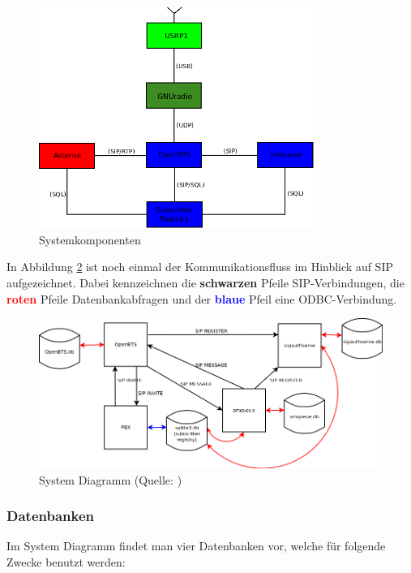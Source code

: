\begin{figure}[htbp]
	\centering
		\includegraphics[width=0.80\textwidth]{img/openbts_comp.png}
	\caption{Systemkomponenten}
	\label{fig:openbts_comp}
\end{figure}


In Abbildung \ref{fig:openbts_system_diagram} ist noch einmal der Kommunikationsfluss im Hinblick auf SIP aufgezeichnet. Dabei kennzeichnen die \textbf{schwarzen} Pfeile SIP-Verbindungen, die \textcolor{red}{\textbf{roten}} Pfeile Datenbankabfragen und der \textcolor{blue}{\textbf{blaue}} Pfeil eine ODBC-Verbindung.

\begin{figure}[hbtp]
	\centering
		\includegraphics[width=1.00\textwidth]{img/openbts_system_diagram.png}
	\caption{System Diagramm (Quelle: \cite{bib:diagramm:openbts})}
	\label{fig:openbts_system_diagram}
\end{figure}
\newpage
\subsubsection{Datenbanken}
Im System Diagramm findet man vier Datenbanken vor, welche für folgende Zwecke benutzt werden:

